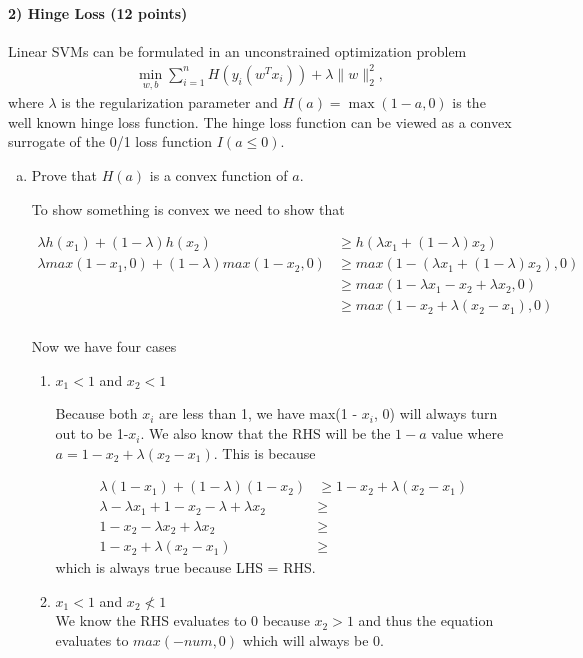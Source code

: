 \documentclass[11pt]{article}
\begin{document}
\newpage
\paragraph{2) Hinge Loss (12 points)}

Linear SVMs can be formulated in an unconstrained optimization problem
\begin{align}\label{SVM}
\min_{w,b}\sum_{i=1}^n H(y_i(w^Tx_i)) + \lambda\|w\|_2^2,
\end{align}
where $\lambda$ is the regularization parameter and $H(a) = \max(1-a,0)$ is the well known hinge loss function. The hinge loss function can be viewed as a convex surrogate of the 0/1 loss function $I(a \leq 0)$.
\begin{enumerate}[(a)]
\item Prove that $H(a)$ is a convex function of $a$.

To show something is convex we need to show that

\begin{align*}
\lambda h(x_1) + (1-\lambda)h(x_2) &\geq  h(\lambda x_1 + (1-\lambda)x_2) \\
\lambda max(1-x_1, 0) + (1-\lambda)max(1-x_2, 0) &\geq max(1-(\lambda x_1 + (1-\lambda)x_2), 0) \\
&\geq max(1- \lambda x_1 -x_2 +\lambda x_2, 0) \\
&\geq max(1- x_2 + \lambda (x_2 - x_1), 0) \\
\end{align*}

Now we have four cases
\begin{enumerate}
	\item $x_1 < 1$ and $x_2 < 1$

	Because both $x_i$ are less than 1, we have max(1 - $x_i$, 0) will always turn out to be 1-$x_i$.
	We also know that the RHS will be the $1-a$ value where $a = 1- x_2 + \lambda (x_2 - x_1)$.
	This is because 

	\begin{align*}
	\lambda(1-x_1) + (1-\lambda)(1-x_2) &\geq 1-x_2 + \lambda(x_2-x_1) \\
	\lambda - \lambda x_1 + 1 - x_2 - \lambda + \lambda x_2 &\geq \\
	1 - x_2 - \lambda x_2 + \lambda x_2 &\geq	\\
	1 - x_2 + \lambda(x_2 - x_1) &\geq 
	\end{align*}
	which is always true because LHS = RHS.

	\item $x_1 < 1$ and $x_2 \nless 1$ \\
	We know the RHS evaluates to 0 because $x_2 > 1$ and thus the equation evaluates to $max(-num, 0)$ which will always be 0.


\end{enumerate}
\end{enumerate}
\end{document}
